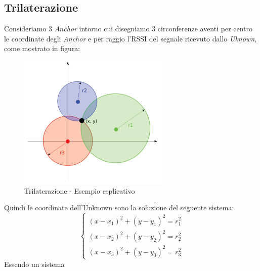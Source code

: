 \subsection{Trilaterazione}
\label{trilaterazione}
Consideriamo 3 \textit{Anchor} intorno cui disegniamo 3 circonferenze aventi per centro le coordinate degli \textit{Anchor} e per raggio l'RSSI del segnale ricevuto dallo \textit{Uknown}, come mostrato in figura:
\begin{figure}[H]  
	\centering 
	\includegraphics[scale=0.8]{ContestoApplicativo/trilaterazione.png}
	\caption{Trilaterazione - Esempio esplicativo}
	\label{fig:trilaterazione}
\end{figure}
Quindi le coordinate dell'Unknown sono la soluzione del seguente sistema:
\begin{equation}
\begin{cases}
(x-x_1)^2 + (y-y_1)^2 = r_1^2\\
(x-x_2)^2 + (y-y_2)^2 = r_2^2\\
(x-x_3)^2 + (y-y_3)^2 = r_3^2
\end{cases}
\end{equation}
Essendo un sistema 










